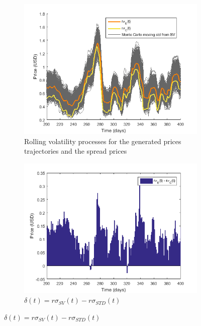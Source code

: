 \documentclass[11pt,a4,twosided,singlespacing,titlepagenumber=on]{scrreprt}
\numberwithin{equation}{chapter} %
\theoremstyle{remark}
\begin{document}
\begin{figure}[H]
    \centering
    \begin{subfigure}[t]{0.49\textwidth}
        \centering
        \includegraphics[width=1\textwidth]{model_vol/3}
        \caption{Rolling volatility processes for the generated prices trajectories and the spread prices}
        \label{vol_mod_3}
    \end{subfigure}
    \begin{subfigure}[t]{0.49\textwidth}
        \centering
        \includegraphics[width=1\textwidth]{model_vol/5}
        \caption{$\delta(t) = r\sigma_{SV}(t) - r\sigma_{STD}(t)$}
        \label{fig:diff_vol}
    \end{subfigure}

\end{figure}
\end{document}
